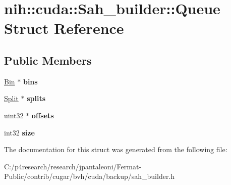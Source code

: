 \hypertarget{structnih_1_1cuda_1_1_sah__builder_1_1_queue}{}\section{nih\+:\+:cuda\+:\+:Sah\+\_\+builder\+:\+:Queue Struct Reference}
\label{structnih_1_1cuda_1_1_sah__builder_1_1_queue}
\subsection*{Public Members}
\begin{DoxyCompactItemize}
\item 
\mbox{\label{structnih_1_1cuda_1_1_sah__builder_1_1_queue_afeb7261cf5ee3d888c67f3a0fdda3cad}} 
\hyperlink{structnih_1_1cuda_1_1_sah__builder_1_1_bin}{Bin} $\ast$ {\bfseries bins}
\item 
\mbox{\label{structnih_1_1cuda_1_1_sah__builder_1_1_queue_a55fce2cbbb5389fa0d82b2c4e5d1653a}} 
\hyperlink{structnih_1_1cuda_1_1_sah__builder_1_1_split}{Split} $\ast$ {\bfseries splits}
\item 
\mbox{\label{structnih_1_1cuda_1_1_sah__builder_1_1_queue_a3ddbfa702fc7e03059ce26c59e121011}} 
uint32 $\ast$ {\bfseries offsets}
\item 
\mbox{\label{structnih_1_1cuda_1_1_sah__builder_1_1_queue_a171ed77d5b868345a6f1c6207b662316}} 
int32 {\bfseries size}
\end{DoxyCompactItemize}


The documentation for this struct was generated from the following file\+:\begin{DoxyCompactItemize}
\item 
C\+:/p4research/research/jpantaleoni/\+Fermat-\/\+Public/contrib/cugar/bvh/cuda/backup/sah\+\_\+builder.\+h\end{DoxyCompactItemize}
